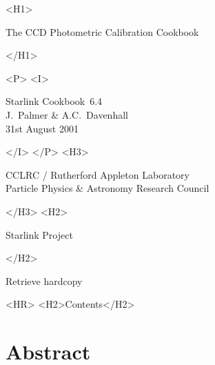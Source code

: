 \documentclass[twoside,11pt]{article}
\newcommand{\stardoccategory}  {Starlink Cookbook}
\newcommand{\stardocsource}    {sc\stardocnumber}
\newcommand{\stardocnumber}    {6.4}
\newcommand{\stardocauthors}   {J.~Palmer \& A.C.~Davenhall}
\newcommand{\stardocdate}      {31st August 2001}
\newcommand{\stardoctitle}     {The CCD Photometric Calibration Cookbook}
\newcommand{\htmladdnormallink}[2]{#1}
\newcommand{\htmladdimg}[1]{}
\newcommand{\htmlref}[2]{#1}
\newcommand{\htmladdtonavigation}[1]{}
\newcommand{\xlabel}[1]{}
\begin{document}
\begin{htmlonly}
   \xlabel{}
   \begin{rawhtml} <H1> \end{rawhtml}
      \stardoctitle\\
   \begin{rawhtml} </H1> \end{rawhtml}


   \begin{rawhtml} <P> <I> \end{rawhtml}
   \stardoccategory\ \stardocnumber \\
   \stardocauthors \\
   \stardocdate
   \begin{rawhtml} </I> </P> <H3> \end{rawhtml}
      \htmladdnormallink{CCLRC}{http://www.cclrc.ac.uk} /
      \htmladdnormallink{Rutherford Appleton Laboratory}
                        {http://www.cclrc.ac.uk/ral} \\
      \htmladdnormallink{Particle Physics \& Astronomy Research Council}
                        {http://www.pparc.ac.uk} \\
   \begin{rawhtml} </H3> <H2> \end{rawhtml}
      \htmladdnormallink{Starlink Project}{http://www.starlink.ac.uk/}
   \begin{rawhtml} </H2> \end{rawhtml}
   \htmladdnormallink{\htmladdimg{source.gif} Retrieve hardcopy}
      {http://www.starlink.ac.uk/cgi-bin/hcserver?\stardocsource}\\

  \label{stardoccontents}
  \begin{rawhtml}
    <HR>
    <H2>Contents</H2>
  \end{rawhtml}
  \htmladdtonavigation{\htmlref{\htmladdimg{contents_motif.gif}}
        {stardoccontents}}

  \section{\xlabel{abstract}Abstract}
\end{htmlonly}
\end{document}
